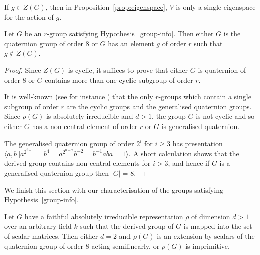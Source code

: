 If $g \in Z(G)$, then in Proposition~\ref{prop:eigenspace}, $V$ is only a single eigenspace for the action of $g$. 


\begin{Theo}  \label{thm:exists_g}
Let $G$ be an  $r$-group %
satisfying Hypothesis~\ref{group-info}. Then either 
$G$ is the quaternion group of order $8$ or $G$ 
has an element $g$ of order $r$ such that 
$g \not \in Z(G)$. %
\end{Theo}

\begin{proof}
Since $Z(G)$ is cyclic, it suffices to prove 
that either $G$ is quaternion of order $8$ or 
$G$ contains more than one cyclic subgroup of order $r$. 

It is well-known (see for instance \cite[3.15]{Zassenhaus}) 
that the only $r$-groups which contain a single 
subgroup of order $r$ are the cyclic groups and 
the generalised quaternion groups. Since $\rho(G)$ 
is absolutely irreducible and $d > 1$, the group 
$G$ is not cyclic and so either $G$ has a non-central 
element of order $r$ or $G$ is generalised quaternion.

The generalised quaternion group of order $2^i$ 
for $i \geq 3$ has presentation 
$\langle a, b \ | a^{2^{i-1}} = b^4 = 
a^{2^{n-2}}b^{-2} =  b^{-1} a ba = 1 \rangle$. 
A short calculation shows that the derived group 
contains non-central elements for $i > 3$, 
and hence if $G$ is a generalised quaternion 
group then $|G| = 8$.
\end{proof}

We finish this section with our characterisation 
of the groups satisfying Hypothesis~\ref{group-info}.

\begin{Theo}  \label{thm:classify_scalars}
Let $G$ have a faithful absolutely irreducible 
representation $\rho$ of dimension $d > 1$ over an arbitrary field $k$ 
such that the derived group of $G$ is mapped
into the set of scalar matrices. 
Then either $d = 2$ and $\rho(G)$ 
is an extension by scalars of the quaternion 
group of order $8$ acting semilinearly, 
or $\rho(G)$ is imprimitive.
\end{Theo}

